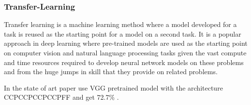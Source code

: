 \subsubsection{Transfer-Learning}
\label{sec:transferlearning}
Transfer learning is a machine learning method where a model developed for a task is reused as the starting point for a model on a second task.
It is a popular approach in deep learning where pre-trained models are used as the starting point on computer vision and natural language processing tasks given the vast compute and time resources required to develop neural network models on these problems and from the huge jumps in skill that they provide on related problems.

In the state of art paper use VGG pretrained model with the architecture CCPCCPCCPCCPFF and get 72.7\% .

